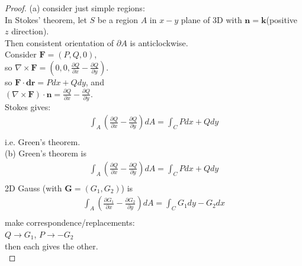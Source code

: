 \documentclass[a4paper]{article}
\begin{document}
\begin{proof}
(a) consider just simple regions:\\
In Stokes' theorem, let $S$ be a region $A$ in $x-y$ plane of 3D with $\mathbf{n}=\mathbf{k}$(positive $z$ direction).\\
Then consistent orientation of $\partial A$ is anticlockwise.\\
Consider $\mathbf{F}=\left(P,Q,0\right)$,\\
so $\nabla\times\mathbf{F}=\left(0,0,\frac{\partial Q}{\partial x}-\frac{\partial Q}{\partial y}\right)$.\\
so $\mathbf{F}\cdot\mathbf{dr}=Pdx+Qdy$, and\\
$\left(\nabla\times\mathbf{F}\right)\cdot\mathbf{n}=\frac{\partial Q}{\partial x}-\frac{\partial Q}{\partial y}$.\\
Stokes gives:\\
\begin{equation*}
\begin{aligned}
\int_{A} \left(\frac{\partial Q}{\partial x}-\frac{\partial Q}{\partial y}\right)dA = \int_{C} Pdx+Qdy\\
\end{aligned}
\end{equation*}
i.e. Green's theorem.\\

(b) Green's theorem is \\
\begin{equation*}
\begin{aligned}
\int_{A} \left(\frac{\partial Q}{\partial x}-\frac{\partial Q}{\partial y}\right)dA = \int_{C} Pdx+Qdy\\
\end{aligned}
\end{equation*}
2D Gauss (with $\mathbf{G}=\left(G_{1},G_{2}\right)$) is\\
\begin{equation*}
\begin{aligned}
\int_{A} \left(\frac{\partial G_{1}}{\partial x}-\frac{\partial G_{2}}{\partial y}\right)dA = \int_{C} G_{1} dy-G_{2} dx\\
\end{aligned}
\end{equation*}
make correspondence/replacements:\\
$Q\to G_{1}$, $P\to -G_{2}$\\
then each gives the other.\\


\end{proof}
\end{document}
